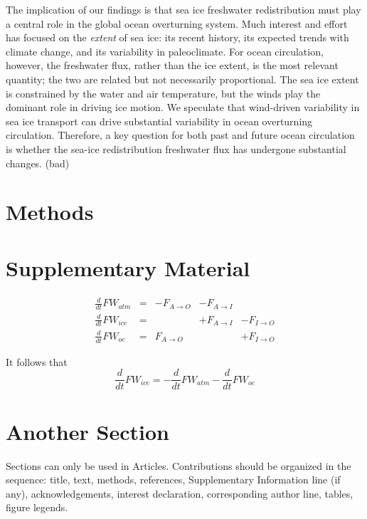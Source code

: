 \documentclass{naturemod}
\newcommand{\od}[2]{\ensuremath{\frac{d #1}{d #2}}}
\begin{document}
The implication of our findings is that sea ice freshwater redistribution must play a central role in the global ocean overturning system. Much interest and effort has focused on the {\em extent} of sea ice: its recent history, its expected trends with climate change, and its variability in paleoclimate. For ocean circulation, however, the freshwater flux, rather than the ice extent, is the most relevant quantity; the two are related but not necessarily proportional. The sea ice extent is constrained by the water and air temperature, but the winds play the dominant role in driving ice motion. We speculate that wind-driven variability in sea ice transport can drive substantial variability in ocean overturning circulation. Therefore, a key question for both past and future ocean circulation is whether the sea-ice redistribution freshwater flux has undergone substantial changes. (bad)



\section*{Methods}

\section*{Supplementary Material}

\begin{align}
&\od{}{t}FW_{atm} & = &- F_{A \to O} & -F_{A \to I}  & \ 		  & \\
&\od{}{t}FW_{ice}  & = & \		       & + F_{A \to I} & - F_{I \to O}& \\
&\od{}{t}FW_{oc}  & =  & F_{A \to O}  & \                  & + F_{I \to O}& 
\end{align}

It follows that
\begin{equation}
\od{}{t}FW_{ice} = -\od{}{t}FW_{atm} - \od{}{t}FW_{oc} 
\end{equation}


\section*{Another Section}

Sections can only be used in Articles.  Contributions should be
organized in the sequence: title, text, methods, references,
Supplementary Information line (if any), acknowledgements,
interest declaration, corresponding author line, tables, figure
legends.
\end{document}
